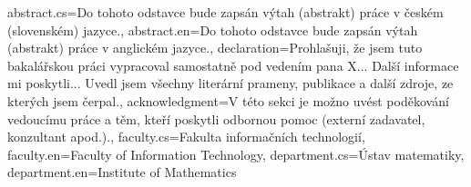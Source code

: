 \documentclass{fitthesis}
\begin{document}
{  %
  abstract.cs={Do tohoto odstavce bude zapsán výtah (abstrakt) práce v českém (slovenském) jazyce.}, %
  abstract.en={Do tohoto odstavce bude zapsán výtah (abstrakt) práce v anglickém jazyce.}, %
  declaration={Prohlašuji, že jsem tuto bakalářskou práci vypracoval samostatně pod vedením pana X...
Další informace mi poskytli...
Uvedl jsem všechny literární prameny, publikace a další zdroje, ze kterých jsem čerpal.},
  acknowledgment={V této sekci je možno uvést poděkování vedoucímu práce a těm, kteří poskytli odbornou pomoc
(externí zadavatel, konzultant apod.).},
  faculty.cs={Fakulta informačních technologií}, %
  faculty.en={Faculty of Information Technology}, %
  department.cs={Ústav matematiky}, %
  department.en={Institute of Mathematics} %
}
\end{document}
